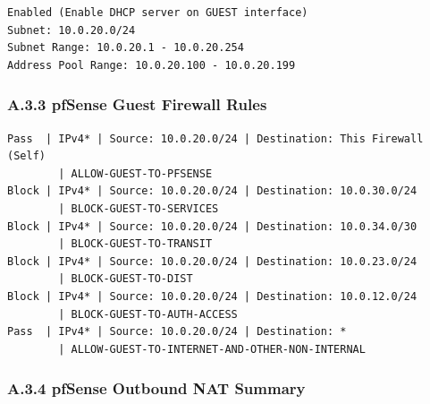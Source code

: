 \documentclass[11pt]{article}
\begin{document}
\begin{verbatim}
Enabled (Enable DHCP server on GUEST interface)
Subnet: 10.0.20.0/24
Subnet Range: 10.0.20.1 - 10.0.20.254
Address Pool Range: 10.0.20.100 - 10.0.20.199
\end{verbatim}


\subsubsection{A.3.3 pfSense Guest Firewall Rules}
\label{sec:appendix-a-pfsense-guest-firewall-rules}

\begin{verbatim}
Pass  | IPv4* | Source: 10.0.20.0/24 | Destination: This Firewall (Self) 
        | ALLOW-GUEST-TO-PFSENSE
Block | IPv4* | Source: 10.0.20.0/24 | Destination: 10.0.30.0/24       
        | BLOCK-GUEST-TO-SERVICES
Block | IPv4* | Source: 10.0.20.0/24 | Destination: 10.0.34.0/30       
        | BLOCK-GUEST-TO-TRANSIT
Block | IPv4* | Source: 10.0.20.0/24 | Destination: 10.0.23.0/24       
        | BLOCK-GUEST-TO-DIST
Block | IPv4* | Source: 10.0.20.0/24 | Destination: 10.0.12.0/24       
        | BLOCK-GUEST-TO-AUTH-ACCESS
Pass  | IPv4* | Source: 10.0.20.0/24 | Destination: *                  
        | ALLOW-GUEST-TO-INTERNET-AND-OTHER-NON-INTERNAL
\end{verbatim}


\subsubsection{A.3.4 pfSense Outbound NAT Summary}
\label{sec:appendix-a-pfsense-outbound-nat-summary}
\end{document}
